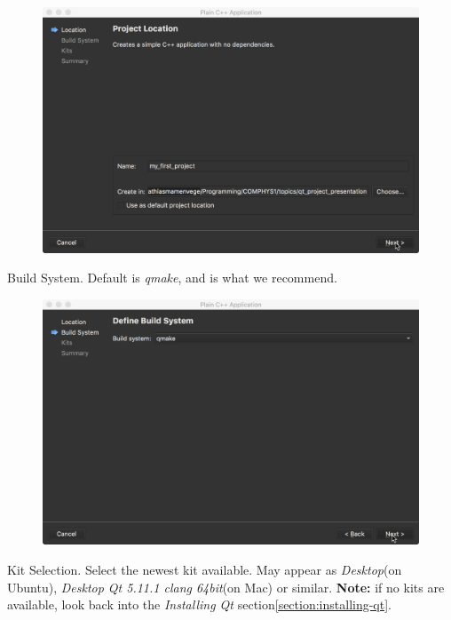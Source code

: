\documentclass[11pt]{article}
\begin{document}
\begin{figure}[H]
    \centering
    \includegraphics[width=\textwidth]{figures/new_project/select_folder_location.png}
\end{figure}
Build System. Default is \textit{qmake}, and is what we recommend.
\begin{figure}[H]
    \centering
    \includegraphics[width=\textwidth]{figures/new_project/default_build_system.png}
\end{figure}
Kit Selection. Select the newest kit available. May appear as \textit{Desktop}(on Ubuntu), \textit{Desktop Qt 5.11.1 clang 64bit}(on Mac) or similar. \textbf{Note:} if no kits are available, look back into the \textit{Installing Qt} section\ref{section:installing-qt}.
\end{document}

